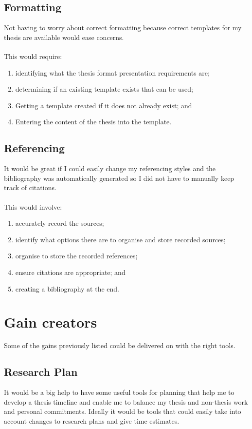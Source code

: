 \documentclass{article}
\begin{document}
\subsection*{Formatting}

Not having to worry about correct formatting because correct templates for my thesis are available would ease concerns.\\\\
This would require:
\begin{enumerate}
    \item identifying what the thesis format presentation requirements are;
    \item determining if an existing template exists that can be used;
    \item Getting a template created if it does not already exist; and
    \item Entering the content of the thesis into the template.
\end{enumerate}

\subsection*{Referencing}

It would be great if I could easily change my referencing styles and the bibliography was automatically generated so I did not have to manually keep track of citations.\\\\
This would involve:
\begin{enumerate}
    \item accurately record the sources;
    \item identify what options there are to organise and store recorded sources;
    \item organise to store the recorded references;
    \item ensure citations are appropriate; and
    \item creating a bibliography at the end.
\end{enumerate}

\section*{Gain creators}
Some of the gains previously listed could be delivered on with the right tools.
\subsection*{Research Plan}
It would be a big help to have some useful tools for planning that help me to develop a thesis timeline and enable me to balance my thesis and non-thesis work and personal commitments. Ideally it would be tools that could easily take into account changes to research plans and give time estimates. \par
\end{document}
